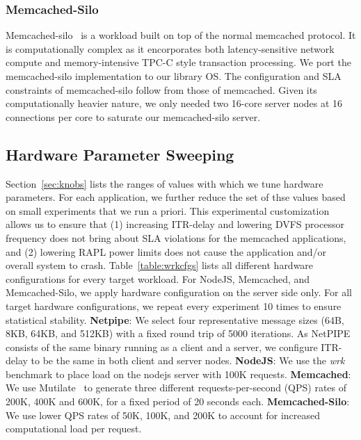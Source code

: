 
\subsubsection{Memcached-Silo}
Memcached-silo~\cite{mcdsilo, zygos} is a workload built on top of the normal memcached protocol. It is computationally complex as it encorporates both latency-sensitive network compute and memory-intensive TPC-C style transaction processing. We port the memcached-silo implementation to our library OS. The configuration and SLA constraints of memcached-silo follow from those of memcached. Given its computationally heavier nature, we only needed two 16-core server nodes at 16 connections per core to saturate our memcached-silo server.


\subsection{Hardware Parameter Sweeping}
\label{sec:hw_tuning}
Section~\ref{sec:knobs} lists the ranges of values with which we tune hardware parameters. For each application, we further reduce the set of thse values based on small experiments that we run a priori. This experimental customization allows us to ensure that (1) increasing ITR-delay and lowering DVFS processor frequency does not bring about SLA violations for the memcached applications, and (2) lowering RAPL power limits does not cause the application and/or overall system to crash. Table~\ref{table:wrkcfgs} lists all different hardware configurations for every target workload. For NodeJS, Memcached, and Memcached-Silo, we apply hardware configuration on the server side only. For all target hardware configurations, we repeat every experiment 10 times to ensure statistical stability. \textbf{Netpipe}: We select four representative message sizes (64B, 8KB, 64KB, and 512KB) with a fixed round trip of 5000 iterations.  As NetPIPE consists of the same binary running as a client and a server, we configure ITR-delay to be the same in both client and server nodes. \textbf{NodeJS}: We use the \textit{wrk}~\cite{wrk} benchmark to place load on the nodejs server with 100K requests. \textbf{Memcached}: We use Mutilate~\cite{mutilate} to generate three different requests-per-second (QPS) rates of 200K, 400K and 600K, for a fixed period of 20 seconds each. \textbf{Memcached-Silo}: We use lower QPS rates of 50K, 100K, and 200K to account for increased computational load per request.

